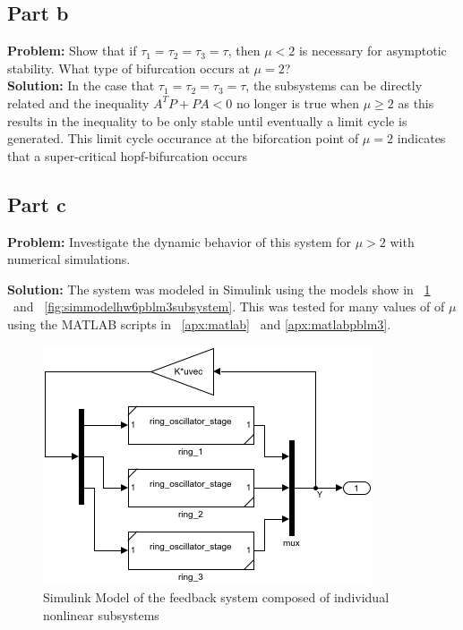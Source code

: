 \documentclass[letter]{article}
\begin{document}
\subsection{Part b}
\textbf{Problem:}
Show that if $\tau_1 = \tau_2 = \tau_3 = \tau$, then $\mu <2$ is necessary for asymptotic stability. What type of bifurcation occurs at $\mu = 2$?\\

\noindent
\textbf{Solution:}
In the case that  $\tau_1 = \tau_2 = \tau_3 = \tau$, the subsystems can be directly related and the inequality $A^T P + P A < 0$ no longer is true when $\mu \geq 2$ as this results in the inequality to be only stable until eventually a limit cycle is generated. This limit cycle occurance at the biforcation point of $\mu = 2$ indicates that a super-critical hopf-bifurcation occurs


\subsection{Part c}
\textbf{Problem:}
Investigate the dynamic behavior of this system for $\mu > 2$ with numerical simulations.

\noindent
\textbf{Solution:}
The system was modeled in Simulink using the models show in \figurename \ \ref{fig:simmodelhw6pblm3} \ and \figurename \ \ref{fig:simmodelhw6pblm3subsystem}. This was tested for many values of of $\mu$ using the MATLAB scripts in \appendixname \ \ref{apx:matlab} \ and \ref{apx:matlabpblm3}.

\begin{figure}[p]
	\centering
	\includegraphics[width=0.7\linewidth]{fig/sim_model_HW6_pblm3}
	\caption{Simulink Model of the feedback system composed of individual nonlinear subsystems}
	\label{fig:simmodelhw6pblm3}
\end{figure}
\end{document}
